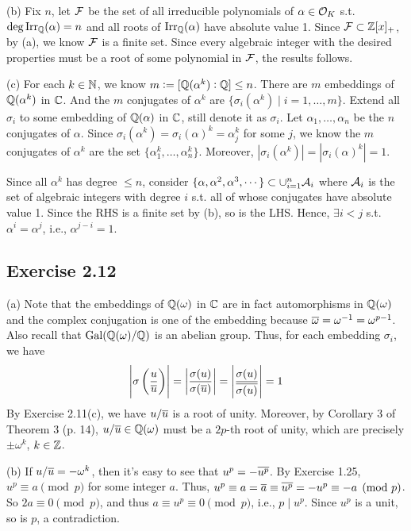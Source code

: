 \documentclass[../Marcus.tex]{subfiles}
\begin{document}
(b) Fix $n$, let $\mathcal{F}$ be the set of all irreducible polynomials of $\alpha\in\mathcal{O}_K$ s.t. $\deg\operatorname{Irr}_{\mathbb{Q}}(\alpha)=n$ and all roots of $\operatorname{Irr}_{\mathbb{Q}}(\alpha)$ have absolute value 1. Since $\mathcal{F}\subset\mathbb{Z}[x]_+$, by (a), we know $\mathcal{F}$ is a finite set. Since every algebraic integer with the desired properties must be a root of some polynomial in $\mathcal{F}$, the results follows.

(c) For each $k\in\mathbb{N}$, we know $m:=[\mathbb{Q}(\alpha^k):\mathbb{Q}] \leq n$. There are $m$ embeddings of $\mathbb{Q}(\alpha^k)$ in $\mathbb{C}$. And the $m$ conjugates of $\alpha^k$ are $\{\sigma_i(\alpha^k)\mid i=1,\ldots,m\}$. Extend all $\sigma_i$ to some embedding of $\mathbb{Q}(\alpha)$ in $\mathbb{C}$, still denote it as $\sigma_i$. Let $\alpha_1,\ldots,\alpha_n$ be the $n$ conjugates of $\alpha$. Since $\sigma_i(\alpha^k)=\sigma_i(\alpha)^k=\alpha_j^k$ for some $j$, we know the $m$ conjugates of $\alpha^k$ are the set $\{\alpha_1^k,\ldots,\alpha_n^k\}$. Moreover, $|\sigma_i(\alpha^k)|=|\sigma_i(\alpha)^k|=1$.

Since all $\alpha^k$ has degree $\leq n$, consider $\{\alpha,\alpha^2,\alpha^3,\cdots\} \subset \cup_{i=1}^n \mathcal{A}_i$ where $\mathcal{A}_i$ is the set of algebraic integers with degree $i$ s.t. all of whose conjugates have absolute value 1. Since the RHS is a finite set by (b), so is the LHS. Hence, $\exists i< j$ s.t. $\alpha^i=\alpha^j$, i.e., $\alpha^{j-i}=1$.

\subsection*{Exercise 2.12}

(a) Note that the embeddings of $\mathbb{Q}(\omega)$ in $\mathbb{C}$ are in fact automorphisms in $\mathbb{Q}(\omega)$ and the complex conjugation is one of the embedding because $\overline{\omega}=\omega^{-1}=\omega^{p-1}$. Also recall that $\operatorname{Gal}(\mathbb{Q}(\omega)/\mathbb{Q})$ is an abelian group. Thus, for each embedding $\sigma_i$, we have $$\left|\sigma\left(\frac{u}{\overline{u}}\right)\right| = \left|\frac{\sigma(u)}{\sigma(\overline{u})}\right| = \left|\frac{\sigma(u)}{\overline{\sigma(u)}}\right| = 1$$ By Exercise 2.11(c), we have $u/\overline{u}$ is a root of unity. Moreover, by Corollary 3 of Theorem 3 (p. 14), $u/\overline{u}\in\mathbb{Q}(\omega)$ must be a $2p$-th root of unity, which are precisely $\pm \omega^k$, $k\in\mathbb{Z}$.

(b) If $u/\overline{u}=-\omega^k$, then it's easy to see that $u^p=-\overline{u^p}$. By Exercise 1.25, $u^p\equiv a \pmod{p}$ for some integer $a$. Thus, $u^p \equiv a = \overline{a} \equiv \overline{u^p} = -u^p \equiv -a \pmod{p}$. So $2a\equiv 0 \pmod{p}$, and thus $a\equiv u^p \equiv0 \pmod{p}$, i.e., $p\mid u^p$. Since $u^p$ is a unit, so is $p$, a contradiction.
\end{document}
